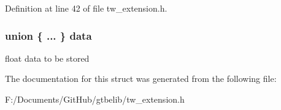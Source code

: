Definition at line 42 of file tw\+\_\+extension.\+h.

\hypertarget{structfloat_flash_a26e87220519c775d0f9d4ac76db58ef2}{
\subsubsection[{data}]{\setlength{\rightskip}{0pt plus 5cm}union \{ ... \}   data}}\label{structfloat_flash_a26e87220519c775d0f9d4ac76db58ef2}
float data to be stored 

The documentation for this struct was generated from the following file\+:\begin{DoxyCompactItemize}
\item 
F\+:/\+Documents/\+Git\+Hub/gtbelib/tw\+\_\+extension.\+h\end{DoxyCompactItemize}
